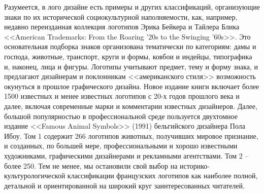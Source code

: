 Разумеется, в лого дизайне есть примеры и других классификаций,
организующие знаки по их исторической социокультурной наполняемости, как,
например, недавно переизданная коллекция логотипов Эрика Бейкера и Тайлера
Блика <<American Trademarks: From the Roaring '20s to the Swinging '60s>>. \autocite{bakerblik2010}
Это основательная подборка знаков организована тематически по категориям:
дамы и господа, животные, транспорт, круги и формы, ковбои и индейцы,
типографика и, наконец, лица и фигуры. Логотипы учитывают предмет, тему и
форму знака, и предлагают дизайнерам и поклонникам <<американского стиля>>
возможность окунуться в прошлое графического дизайна. Новое издание книги
включает более 1500 известных и менее известных логотипов с 20-х годов
прошлого века и далее, включая современные марки и комментарии известных
дизайнеров. Далее, большой популярностью в профессиональной среде пользуется
двухтомное издание <<Famous Animal Symbols>> (1991) бельгийского дизайнера Пола
Ибоу.\autocite{ibou1991}
Том 1 содержит 266 логотипов животных, получивших мировое признание, и
созданных, по большей мере, профессиональными и хорошо известными художниками,
графическими дизайнерами и рекламными агентствами. Том 2 -- более 250. Тем не
менее, мы остановили свой выбор на историко-культурологической классификации французских логотипов как наиболее полной, детальной и ориентированной на широкий круг
заинтересованных читателей.

